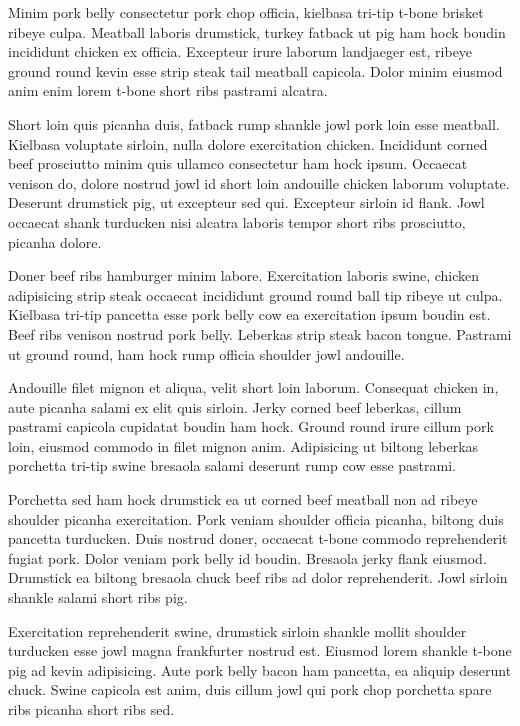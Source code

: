 Minim pork belly consectetur pork chop officia, kielbasa tri-tip t-bone brisket ribeye culpa. Meatball laboris drumstick, turkey fatback ut pig ham hock boudin incididunt chicken ex officia. Excepteur irure laborum landjaeger est, ribeye ground round kevin esse strip steak tail meatball capicola. Dolor minim eiusmod anim enim lorem t-bone short ribs pastrami alcatra.

Short loin quis picanha duis, fatback rump shankle jowl pork loin esse meatball. Kielbasa voluptate sirloin, nulla dolore exercitation chicken. Incididunt corned beef prosciutto minim quis ullamco consectetur ham hock ipsum. Occaecat venison do, dolore nostrud jowl id short loin andouille chicken laborum voluptate. Deserunt drumstick pig, ut excepteur sed qui. Excepteur sirloin id flank. Jowl occaecat shank turducken nisi alcatra laboris tempor short ribs prosciutto, picanha dolore.

Doner beef ribs hamburger minim labore. Exercitation laboris swine, chicken adipisicing strip steak occaecat incididunt ground round ball tip ribeye ut culpa. Kielbasa tri-tip pancetta esse pork belly cow ea exercitation ipsum boudin est. Beef ribs venison nostrud pork belly. Leberkas strip steak bacon tongue. Pastrami ut ground round, ham hock rump officia shoulder jowl andouille.

Andouille filet mignon et aliqua, velit short loin laborum. Consequat chicken in, aute picanha salami ex elit quis sirloin. Jerky corned beef leberkas, cillum pastrami capicola cupidatat boudin ham hock. Ground round irure cillum pork loin, eiusmod commodo in filet mignon anim. Adipisicing ut biltong leberkas porchetta tri-tip swine bresaola salami deserunt rump cow esse pastrami.

Porchetta sed ham hock drumstick ea ut corned beef meatball non ad ribeye shoulder picanha exercitation. Pork veniam shoulder officia picanha, biltong duis pancetta turducken. Duis nostrud doner, occaecat t-bone commodo reprehenderit fugiat pork. Dolor veniam pork belly id boudin. Bresaola jerky flank eiusmod. Drumstick ea biltong bresaola chuck beef ribs ad dolor reprehenderit. Jowl sirloin shankle salami short ribs pig.

Exercitation reprehenderit swine, drumstick sirloin shankle mollit shoulder turducken esse jowl magna frankfurter nostrud est. Eiusmod lorem shankle t-bone pig ad kevin adipisicing. Aute pork belly bacon ham pancetta, ea aliquip deserunt chuck. Swine capicola est anim, duis cillum jowl qui pork chop porchetta spare ribs picanha short ribs sed.

